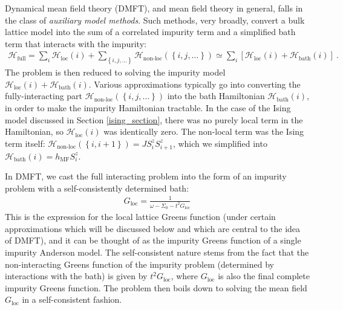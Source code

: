 \documentclass[12pt,onecolumn]{revtex4-2}
\begin{document}
Dynamical mean field theory (DMFT), and mean field theory in general, falls in the class of {\it auxiliary model methods}. Such methods, very broadly, convert a bulk lattice model into the sum of a correlated impurity term and a simplified bath term that interacts with the impurity:
\begin{equation}\begin{aligned}
	\mathcal{H}_\text{full} = \sum_i \mathcal{H}_\text{loc}(i) + \sum_{\left\{ i,j,\ldots \right\}}\mathcal{H}_\text{non-loc}\left(\left\{ i,j,\ldots \right\}\right) \simeq \sum_i\left[\mathcal{H}_\text{loc}(i) + \mathcal{H}_\text{bath}(i)\right] ~.
\end{aligned}\end{equation}
The problem is then reduced to solving the impurity model \(\mathcal{H}_\text{loc}(i) + \mathcal{H}_\text{bath}(i)\). Various approximations typically go into converting the fully-interacting part \(\mathcal{H}_\text{non-loc}\left(\left\{ i,j,\ldots \right\}\right)\) into the bath Hamiltonian \(\mathcal{H}_\text{bath}(i)\), in order to make the impurity Hamiltonian tractable. In the case of the Ising model discussed in Section \ref{ising_section}, there was no purely local term in the Hamiltonian, so \(\mathcal{H}_\text{loc}(i)\) was identically zero. The non-local term was the Ising term itself: \(\mathcal{H}_\text{non-loc}\left(\left\{ i, i+1\right\}\right) = J S_i^z S_{i+1}^z\), which we simplified into \(\mathcal{H}_\text{bath}(i) = h_\text{MF} S_i^z\).

In DMFT, we cast the full interacting problem into the form of an impurity problem with a self-consistently determined bath:
\begin{equation}\begin{aligned}
	G_\text{loc} = \frac{1}{\omega - \Sigma_0 - t^2 G_\text{loc}}
\end{aligned}\end{equation}
This is the expression for the local lattice Greens function (under certain approximations which will be discussed below and which are central to the idea of DMFT), and it can be thought of as the impurity Greens function of a single impurity Anderson model. The self-consistent nature stems from the fact that the non-interacting Greens function of the impurity problem (determined by interactions with the bath) is given by \(t^2 G_\text{loc}\), where \(G_\text{loc}\) is also the final complete impurity Greens function. The problem then boils down to solving the mean field \(G_\text{loc}\) in a self-consistent fashion.
\end{document}

